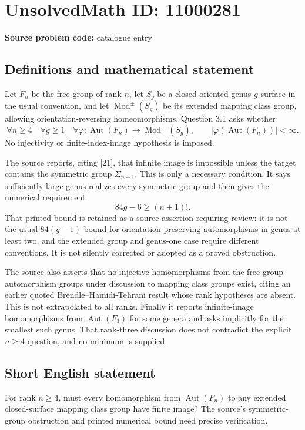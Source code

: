 \documentclass[11pt]{article}
\begin{document}
\section*{UnsolvedMath ID: 11000281}
\textbf{Source problem code:} catalogue entry
\subsection{Definitions and mathematical statement}
Let $F_n$ be the free group of rank $n$, let $S_g$ be a closed oriented genus-$g$ surface in the usual convention, and let $\operatorname{Mod}^{\pm}(S_g)$ be its extended mapping class group, allowing orientation-reversing homeomorphisms. Question 3.1 asks whether
\[
 \forall n\geq4\quad\forall g\geq1\quad
 \forall\varphi:\operatorname{Aut}(F_n)\to\operatorname{Mod}^{\pm}(S_g),
 \qquad |\varphi(\operatorname{Aut}(F_n))|<\infty.
\]
No injectivity or finite-index-image hypothesis is imposed.

The source reports, citing [21], that infinite image is impossible unless the target contains the symmetric group $\Sigma_{n+1}$. This is only a necessary condition. It says sufficiently large genus realizes every symmetric group and then gives the numerical requirement
\[
 84g-6\geq(n+1)!.
\]
That printed bound is retained as a source assertion requiring review: it is not the usual $84(g-1)$ bound for orientation-preserving automorphisms in genus at least two, and the extended group and genus-one case require different conventions. It is not silently corrected or adopted as a proved obstruction.

The source also asserts that no injective homomorphisms from the free-group automorphism groups under discussion to mapping class groups exist, citing an earlier quoted Brendle--Hamidi-Tehrani result whose rank hypotheses are absent. This is not extrapolated to all ranks. Finally it reports infinite-image homomorphisms from $\operatorname{Aut}(F_3)$ for some genera and asks implicitly for the smallest such genus. That rank-three discussion does not contradict the explicit $n\geq4$ question, and no minimum is supplied.
\subsection{Short English statement}
For rank $n\geq4$, must every homomorphism from $\operatorname{Aut}(F_n)$ to any extended closed-surface mapping class group have finite image? The source's symmetric-group obstruction and printed numerical bound need precise verification.
\end{document}
